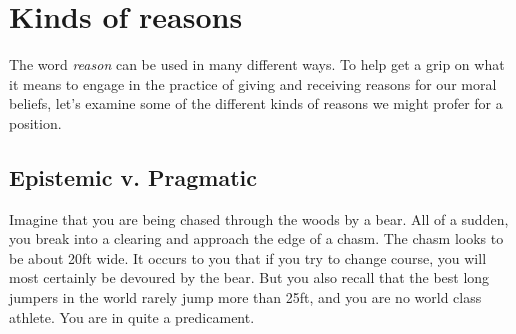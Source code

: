 \documentclass[10pt]{article}
\begin{document}
\begin{comment}
\section{Arguments}
An argument is a set of \textbf{propositions} (sentences or statements), one of which is designated the \textbf{conclusion}, and the rest of which are called the \textbf{premises}.\footnote{For clarity, it is often helpful to present arguments with the propositions written in list format and each of the premises numbered.} To endorse an argument is to maintain that the premises provide some sort of \textbf{support} for the conclusion.  That is, if the argument is any good, then a \textbf{rational} person who believes each of the premises would also be inclined to believe the conclusion.

Engaging in the practice of providing arguments for our beliefs thus appeals to the rationality of the people with whom we are engaged in debate.  Of course, nothing stops a person from accepting that the argument is a good one while still refusing to believe the conclusion.  But in so far as the person has an interest in having reasons for the beliefs they hold, recognition of good arguments should result in appropriate changes in their beliefs.

Arguments provide full fledged reasons to take on particular beliefs or to act in particular ways.  But frequently when we start an inquiry, we may not have well worked out arguments.  Instead, we look for what we might call \textbf{considerations}.  Considerations are ideas that seem to speak in favor of one convclusion over another.  Once we get a bunch of considerations on the table, we can begin sorting through them and see whether the balance of considerations does support one conclusion over the other and how strongly.
\end{comment}

\section{Kinds of reasons}
The word \textit{reason} can be used in many different ways.  To help get a grip on what it means to engage in the practice of giving and receiving reasons for our moral beliefs, let's examine some of the different kinds of reasons we might profer for a position.


\subsection{Epistemic v. Pragmatic}
Imagine that you are being chased through the woods by a bear.  All of a sudden, you break into a clearing and approach the edge of a chasm.  The chasm looks to be about 20ft wide. It occurs to you that if you try to change course, you will most certainly be devoured by the bear.  But you also recall that the best long jumpers in the world rarely jump more than 25ft, and you are no world class athlete. You are in quite a predicament.
\end{document}
